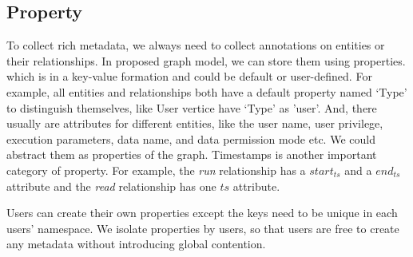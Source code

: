 \subsection{Property}
To collect rich metadata, we always need to collect annotations on entities or their relationships. In proposed graph model, we can store them using properties. which is in a key-value formation and could be default or user-defined. For example, all entities and relationships both have a default property named `Type' to distinguish themselves, like User vertice have `Type' as 'user'. And, there usually are attributes for different entities, like the user name, user privilege, execution parameters, data name, and data permission mode etc. We could abstract them as properties of the graph. Timestamps is another important category of property. For example, the \textit{run} relationship has a $start_{ts}$ and a $end_{ts}$ attribute and the \textit{read} relationship has one $ts$ attribute. 

Users can create their own properties except the keys need to be unique in each users' namespace. We isolate properties by users, so that users are free to create any metadata without introducing global contention.

